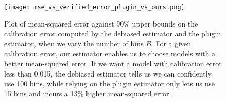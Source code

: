 



\begin{figure}
  \centering
  \texttt{[image: mse\_vs\_verified\_error\_plugin\_vs\_ours.png]}
  \caption{Plot of mean-squared error against 90\% upper bounds on the calibration error computed by the debiased estimator and the plugin estimator, when we vary the number of bins $B$. For a given calibration error, our estimator enables us to choose models with a better mean-squared error. If we want a model with calibration error less than 0.015, the debiased estimator tells us we can confidently use 100 bins, while relying on the plugin estimator only lets us use 15 bins and incurs a 13\% higher mean-squared error.}
  \label{fig:mse_vs_ce_estimator}
\end{figure}

